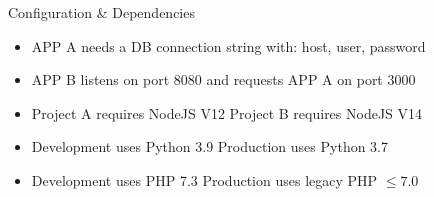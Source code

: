 \documentclass{beamer}
\begin{document}
\begin{frame}{}
  \begin{center}
    \Large Configuration \& Dependencies
  \end{center}

  \begin{block}{}
    \begin{itemize}
      \small
      \setlength\itemsep{0em}
      \item APP A needs a DB connection string with: host, user, password
      \item APP B listens on port 8080 and requests APP A on port 3000
    \end{itemize}
  \end{block}
  \begin{block}{}
    \begin{itemize}
      \small
      \setlength\itemsep{0em}
      \item Project A requires NodeJS V12 \text{\marvosymLightning} Project B requires NodeJS V14
      \item Development uses Python 3.9 \text{\marvosymLightning} Production uses Python 3.7
      \item Development uses PHP 7.3 \text{\marvosymLightning} Production uses legacy PHP \(\leq 7.0\)
    \end{itemize}
  \end{block}
\end{frame}

\end{document}
